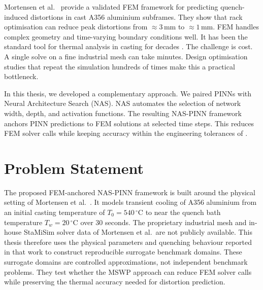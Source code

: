 Mortensen et al.~\cite{mortensen2026} provide a validated FEM framework for
predicting quench-induced distortions in cast A356 aluminium subframes.
They show that rack optimisation can reduce peak distortions from
${\approx}3\,\mathrm{mm}$ to ${\approx}1\,\mathrm{mm}$.
FEM handles complex geometry and time-varying boundary conditions well.
It has been the standard tool for thermal analysis in casting for decades
\cite{wilson1966,mackerle2003,grossmann2024fem}.
The challenge is cost.
A single solve on a fine industrial mesh can take minutes.
Design optimisation studies that repeat the simulation hundreds of times make
this a practical bottleneck.

In this thesis, we developed a complementary approach.
We paired PINNs with Neural Architecture Search (NAS).
NAS automates the selection of network width, depth, and activation functions.
The resulting NAS-PINN framework anchors PINN predictions to FEM solutions at
selected time steps.
This reduces FEM solver calls while keeping accuracy within the engineering
tolerances of \cite{mortensen2026}.

\section{Problem Statement}
\label{sec:problem}

%
The proposed FEM-anchored NAS-PINN framework is built around the physical
setting of Mortensen et al.~\cite{mortensen2026}.
It models transient cooling of A356 aluminium from an initial casting
temperature of $T_0 = 540\,^\circ\mathrm{C}$ to near the quench bath
temperature $T_w = 20\,^\circ\mathrm{C}$ over 30 seconds.
The proprietary industrial mesh and in-house StaMiSim solver data of Mortensen
et al.\ are not publicly available.
This thesis therefore uses the physical parameters and quenching behaviour
reported in that work to construct reproducible surrogate benchmark domains.
These surrogate domains are controlled approximations, not independent
benchmark problems.
They test whether the MSWP approach can reduce FEM solver calls while
preserving the thermal accuracy needed for distortion prediction.

